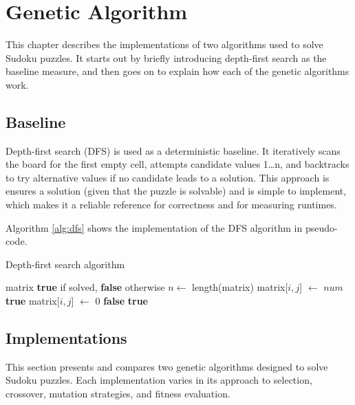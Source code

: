 \section{Genetic Algorithm}\label{sec:algorithm}
This chapter describes the implementations of two algorithms used to solve Sudoku puzzles.
It starts out by briefly introducing depth-first search as the baseline measure, and then goes on to explain how each of the genetic algorithms work.

\subsection{Baseline}
Depth-first search (DFS) is used as a deterministic baseline. It iteratively scans the board for the first empty cell, attempts candidate values 1\dots n, and backtracks to try alternative values if no candidate leads to a solution. This approach is ensures a solution (given that the puzzle is solvable) and is simple to implement, which makes it a reliable reference for correctness and for measuring runtimes.

Algorithm \ref{alg:dfs} shows the implementation of the DFS algorithm in pseudo-code.

\begin{algorithm}[H]
\caption{Depth-first search algorithm}\label{alg:dfs}
\begin{adjustbox}{width=1\textwidth,left}
\begin{minipage}{\textwidth}
\begin{algorithmic}
\Require matrix
\Ensure \textbf{true} if solved, \textbf{false} otherwise
\State $n \gets$ length(matrix)
          \State matrix[$i,j$] $\gets$ $num$
           \State \Return \textbf{true} \EndIf
          \State matrix[$i,j$] $\gets$ 0
        \EndIf
      \EndFor
      \State \Return \textbf{false}
    \EndIf
  \EndFor
\EndFor
\State \Return \textbf{true}
\end{algorithmic}
\end{minipage}
\end{adjustbox}
\end{algorithm}

\subsection{Implementations}
This section presents and compares two genetic algorithms designed to solve Sudoku puzzles. Each implementation varies in its approach to selection, crossover, mutation strategies, and fitness evaluation.

